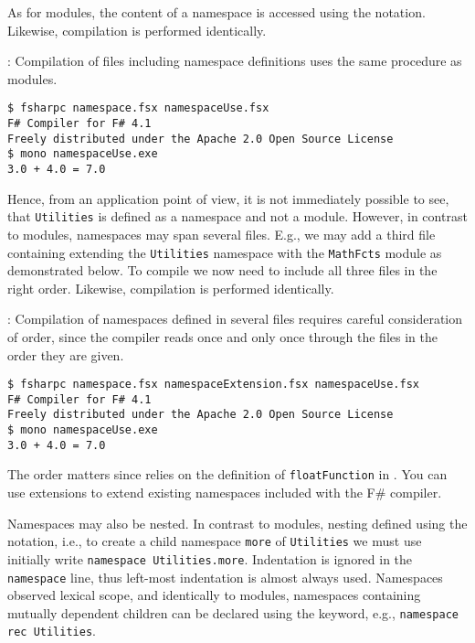 As for modules, the content of a namespace is accessed using the  notation.
%
%
Likewise, compilation is performed identically.
\begin{codeNOutput}{: Compilation of files including namespace definitions uses the same procedure as modules.}
\begin{lstlisting}[language=console,escapechar=§]
$ fsharpc namespace.fsx namespaceUse.fsx                                           
F# Compiler for F# 4.1
Freely distributed under the Apache 2.0 Open Source License
$ mono namespaceUse.exe 
3.0 + 4.0 = 7.0
\end{lstlisting}
\end{codeNOutput}
Hence, from an application point of view, it is not immediately possible to see, that \lstinline{Utilities} is defined as a namespace and not a module.  However, in contrast to modules, namespaces may span several files. E.g., we may add a third file containing extending the \lstinline{Utilities} namespace with the \lstinline{MathFcts} module as demonstrated below.
%
%
To compile we now need to include all three files in the right order.
%
Likewise, compilation is performed identically.
\begin{codeNOutput}{: Compilation of namespaces defined in several files requires careful consideration of order, since the compiler reads once and only once through the files in the order they are given.}
\begin{lstlisting}[language=console,escapechar=§]
$ fsharpc namespace.fsx namespaceExtension.fsx namespaceUse.fsx                                           
F# Compiler for F# 4.1
Freely distributed under the Apache 2.0 Open Source License
$ mono namespaceUse.exe 
3.0 + 4.0 = 7.0
\end{lstlisting}
\end{codeNOutput}
The order matters since  relies on the definition of \lstinline{floatFunction} in . You can use extensions to extend existing namespaces included with the F\# compiler.

Namespaces may also be nested. In contrast to modules, nesting defined using the  notation, i.e., to create a child namespace \lstinline{more} of \lstinline{Utilities} we must use initially write \lstinline{namespace Utilities.more}. Indentation is ignored in the \lstinline{namespace} line, thus left-most indentation is almost always used. Namespaces observed lexical scope, and identically to modules, namespaces containing mutually dependent children can be declared using the  keyword, e.g., \lstinline{namespace rec Utilities}.

